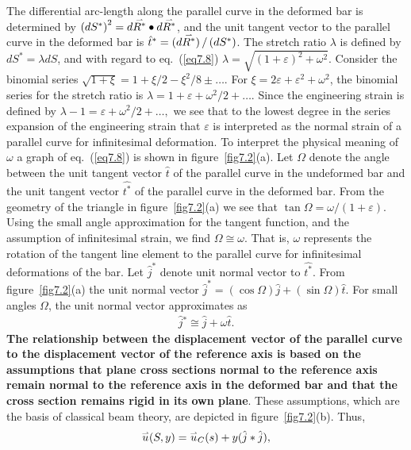 \documentclass{AeroStructure-ERJohnson}
\def\harp#1{\smash{\mathord{\buildrel{\lower3pt\hbox{$\scriptscriptstyle\rightharpoonup$}}\over{#1}}}}
\begin{document}
The differential arc-length along the parallel curve in the deformed bar is determined by $\left(d S^{*}\right)^{2}=d \harp{R^{*}} \bullet d \harp{R^{*}}$, and the unit tangent vector to the parallel curve in the deformed bar is $\hat{t}^{*}=\left(d \harp{R^{*}}\right) /\left(d S^{*}\right)$. The stretch ratio $\lambda$ is defined by $d S^{*}=\lambda d S$, and with regard to eq.~(\ref{eq7.8}) $\lambda=\sqrt{(1+\varepsilon)^{2}+\omega^{2}}$. Consider the binomial series $\sqrt{1+\xi}=1+\xi / 2-\xi^{2} / 8 \pm \ldots.$ For $\xi=2 \varepsilon+\varepsilon^{2}+\omega^{2}$, the binomial series for the stretch ratio is $\lambda=1+\varepsilon+\omega^{2} / 2+\ldots.$ Since the engineering strain is defined by $\lambda-1=\varepsilon+\omega^{2} / 2+\ldots,$ we see that to the lowest degree in the series expansion of the engineering strain that $\varepsilon$ is interpreted as the normal strain of a parallel curve for infinitesimal deformation. To interpret the physical meaning of $\omega$ a graph of eq.~(\ref{eq7.8}) is shown in figure~\ref{fig7.2}(a). Let $\Omega$ denote the angle between the unit tangent vector $\hat{t}$ of the parallel curve in the undeformed bar and the unit tangent vector $\hat{t^{*}}$ of the parallel curve in the deformed bar. From the geometry of the triangle in figure~\ref{fig7.2}(a) we see that $\tan \Omega=\omega /(1+\varepsilon)$. Using the small angle approximation for the tangent function, and the assumption of infinitesimal strain, we find $\Omega \cong \omega$. That is, $\omega$ represents the rotation of the tangent line element to the parallel curve for infinitesimal deformations of the bar. Let $\hat{j}^{*}$ denote unit normal vector to $\hat{t^{*}}$. From figure~\ref{fig7.2}(a) the unit normal vector $\hat{j}^{*}=(\cos \Omega) \hat{j}+(\sin \Omega) \hat{t}$. For small angles $\Omega$, the unit normal vector approximates as
\begin{align}\label{eq7.10}
\hat{j}{ }^{*} \cong \hat{j}+\omega \hat{t}.
\end{align}
\noindent \textbf{The relationship between the displacement vector of the parallel curve to the displacement vector of the reference axis is based on the assumptions that plane cross sections normal to the reference axis remain normal to the reference axis in the deformed bar and that the cross section remains rigid in its own plane}. These assumptions, which are the basis of classical beam theory, are depicted in figure~\ref{fig7.2}(b). Thus,
\begin{align}\label{eq7.11}
\harp{u}(S, y)=\harp{u}_{C}(s)+y(\hat{j} * \hat{j}),
\end{align}
\end{document}
